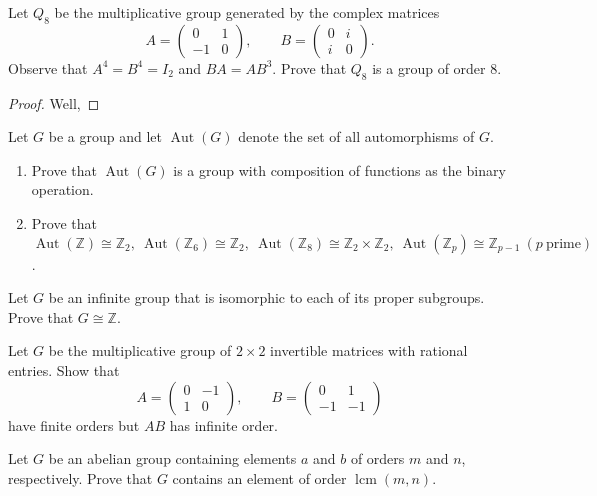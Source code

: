 \documentclass[addpoints,10pt]{exam}
\theoremstyle{plain}
\theoremstyle{definition}
\newtheorem{prob}[thm]{Problem}
\theoremstyle{plain}
\theoremstyle{plain}
\theoremstyle{definition}
\let\oldprob\prob
\let\endoldprob\endprob
\renewenvironment{prob}
  {\begin{singlespace}\oldprob}
  {\endoldprob\end{singlespace}}
\begin{document}
\begin{prob}
Let $Q_8$ be the multiplicative group generated by the complex matrices
\[
A=\begin{pmatrix}0 & 1 \\ -1 & 0\end{pmatrix},
\qquad
B=\begin{pmatrix}0 & i \\ i & 0\end{pmatrix}.
\]
Observe that $A^4=B^4=I_2$ and $BA=AB^3$. Prove that $Q_8$ is a group of order $8$.
\end{prob}

\begin{proof}
Well, 
\end{proof}

\begin{prob}
Let $G$ be a group and let $\operatorname{Aut}(G)$ denote the set of all automorphisms of $G$.
\begin{enumerate}[label=(\alph*)]
\item Prove that $\operatorname{Aut}(G)$ is a group with composition of functions as the binary operation.
\item Prove that $\operatorname{Aut}(\mathbb{Z}) \cong \mathbb{Z}_2,\ 
\operatorname{Aut}(\mathbb{Z}_6)\cong \mathbb{Z}_2,\
\operatorname{Aut}(\mathbb{Z}_8)\cong \mathbb{Z}_2 \times \mathbb{Z}_2,\
\operatorname{Aut}(\mathbb{Z}_p)\cong \mathbb{Z}_{p-1}\ (p\ \text{prime})$.
\end{enumerate}
\end{prob}

\begin{prob}
Let $G$ be an infinite group that is isomorphic to each of its proper subgroups. Prove that $G \cong \mathbb{Z}$.
\end{prob}

\begin{prob}
Let $G$ be the multiplicative group of $2\times 2$ invertible matrices with rational entries. Show that
\[
A=\begin{pmatrix}0 & -1 \\ 1 & 0\end{pmatrix},
\qquad
B=\begin{pmatrix}0 & 1 \\ -1 & -1\end{pmatrix}
\]
have finite orders but $AB$ has infinite order.
\end{prob}

\begin{prob}
Let $G$ be an abelian group containing elements $a$ and $b$ of orders $m$ and $n$, respectively. Prove that $G$ contains an element of order $\operatorname{lcm}(m,n)$.
\end{prob}
\end{document}
